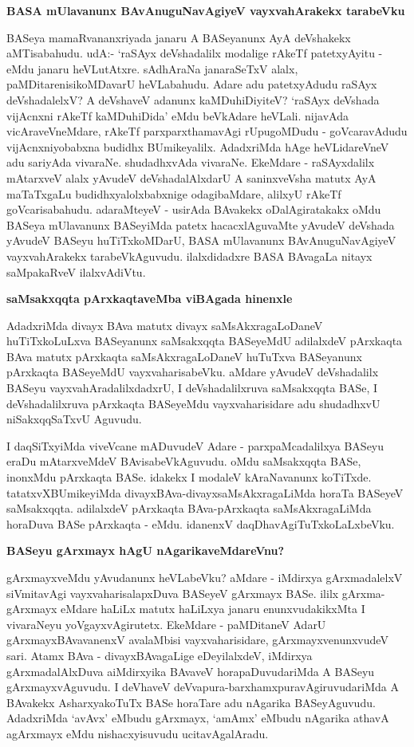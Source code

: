 {\bigskip
\noindent
{\large\bf BASA mUlavanunx BAvAnuguNavAgiyeV vayxvahArakekx tarabeVku}}\label{page10a}
\medskip

\noindent
BASeya mamaRvananxriyada janaru A BASeyanunx AyA deVshakekx aMTisabahudu. udA:- `raSAyx deVshadalilx modalige rAkeTf patetxyAyitu - eMdu janaru heVLutAtxre. sAdhAraNa janaraSeTxV alalx, paMDitarenisikoMDavarU heVLabahudu. Adare adu patetxyAdudu raSAyx deVshadalelxV? A deVshaveV adanunx kaMDuhiDiyiteV? `raSAyx deVshada vijAcnxni rAkeTf kaMDuhiDida' eMdu beVkAdare heVLali. nijavAda vicAraveVneMdare, rAkeTf parxparxthamavAgi rUpugoMDudu - goVcaravAdudu vijAcnxniyobabxna budidhx BUmikeyalilx. AdadxriMda hAge heVLidareVneV adu sariyAda vivaraNe. shudadhxvAda vivaraNe. EkeMdare - raSAyxdalilx mAtarxveV alalx yAvudeV deVshadalAlxdarU A saninxveVsha matutx AyA maTaTxgaLu budidhxyalolxbabxnige odagibaMdare, alilxyU rAkeTf goVcarisabahudu. adaraMteyeV - usirAda BAvakekx oDalAgiratakakx oMdu BASeya mUlavanunx BASeyiMda patetx hacacxlAguvaMte yAvudeV deVshada yAvudeV BASeyu huTiTxkoMDarU, BASA mUlavanunx BAvAnuguNavAgiyeV vayxvahArakekx tarabeVkAguvudu. ilalxdidadxre BASA BAvagaLa nitayx saMpakaRveV ilalxvAdiVtu.

{\bigskip
\noindent
{\large\bf saMsakxqqta pArxkaqtaveMba viBAgada hinenxle}}\label{page11}
\medskip

\noindent
AdadxriMda divayx BAva matutx divayx saMsAkxragaLoDaneV huTiTxkoLuLxva BASeyanunx saMsakxqqta BASeyeMdU adilalxdeV pArxkaqta BAva matutx pArxkaqta saMsAkxragaLoDaneV huTuTxva BASeyanunx pArxkaqta BASeyeMdU vayxvaharisabeVku. aMdare yAvudeV deVshadalilx BASeyu vayxvahAradalilxdadxrU, I deVshadalilxruva saMsakxqqta BASe, I deVshadalilxruva pArxkaqta BASeyeMdu vayxvaharisidare adu shudadhxvU niSakxqqSaTxvU Aguvudu.

I daqSiTxyiMda viveVcane mADuvudeV Adare - parxpaMcadalilxya BASeyu eraDu mAtarxveMdeV BAvisabeVkAguvudu. oMdu saMsakxqqta BASe, inonxMdu pArxkaqta BASe. idakekx I modaleV kAraNavanunx koTiTxde. tatatxvXBUmikeyiMda divayxBAva-divayxsaMsAkxragaLiMda horaTa BASeyeV saMsakxqqta. adilalxdeV pArxkaqta BAva-pArxkaqta saMsAkxragaLiMda horaDuva BASe pArxkaqta - eMdu. idanenxV daqDhavAgiTuTxkoLaLxbeVku.

{\bigskip
\noindent
{\large\bf BASeyu gArxmayx hAgU nAgarikaveMdareVnu?}}\label{page11a}
\medskip

\noindent
gArxmayxveMdu yAvudanunx heVLabeVku? aMdare - iMdirxya gArxmadalelxV siVmitavAgi vayxvaharisalapxDuva BASeyeV gArxmayx BASe. ililx gArxma-gArxmayx eMdare haLiLx matutx haLiLxya janaru enunxvudakikxMta I vivaraNeyu yoVgayxvAgirutetx. EkeMdare - paMDitaneV AdarU gArxmayxBAvavanenxV avalaMbisi vayxvaharisidare, gArxmayxvenunxvudeV sari. Atamx BAva - divayxBAvagaLige eDeyilalxdeV, iMdirxya gArxmadalAlxDuva aiMdirxyika BAvaveV horapaDuvudariMda A BASeyu gArxmayxvAguvudu. I deVhaveV deVvapura-barxhamxpuravAgiruvudariMda A BAvakekx AsharxyakoTuTx BASe horaTare adu nAgarika BASeyAguvudu. AdadxriMda `avAvx' eMbudu gArxmayx, `amAmx' eMbudu nAgarika athavA agArxmayx eMdu nishacxyisuvudu ucitavAgalAradu. 

